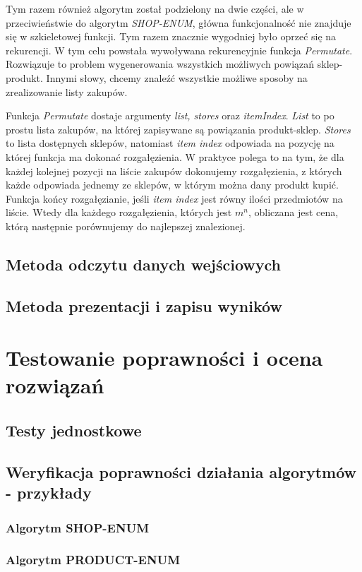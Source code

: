 \documentclass[a4paper]{article}
\let\oldsection\section
\renewcommand\section{\clearpage\oldsection}
\begin{document}
Tym razem również algorytm został podzielony na dwie części, ale w przeciwieństwie do algorytm \textit{SHOP-ENUM}, główna funkcjonalność nie znajduje się w szkieletowej funkcji. Tym razem znacznie wygodniej było oprzeć się na rekurencji. W tym celu powstała wywoływana rekurencyjnie funkcja \textit{Permutate}. Rozwiązuje to problem wygenerowania wszystkich możliwych powiązań sklep-produkt. Innymi słowy, chcemy znaleźć wszystkie możliwe sposoby na zrealizowanie listy zakupów.

Funkcja \textit{Permutate} dostaje argumenty \textit{list, stores} oraz \textit{itemIndex}. \textit{List} to po prostu lista zakupów, na której zapisywane są powiązania produkt-sklep. \textit{Stores} to lista dostępnych sklepów, natomiast \textit{item index} odpowiada na pozycję na której funkcja ma dokonać rozgałęzienia. W praktyce polega to na tym, że dla każdej kolejnej pozycji na liście zakupów dokonujemy rozgałęzienia, z których każde odpowiada jednemy ze sklepów, w którym można dany produkt kupić. Funkcja końcy rozgałęzianie, jeśli \textit{item index} jest równy ilości przedmiotów na liście. Wtedy dla każdego rozgałęzienia, których jest $m^n$, obliczana jest cena, którą następnie porównujemy do najlepszej znalezionej.
\subsection{Metoda odczytu danych wejściowych}
\subsection{Metoda prezentacji i zapisu wyników}

\section{Testowanie poprawności i ocena rozwiązań}
\subsection{Testy jednostkowe}
\subsection{Weryfikacja poprawności działania algorytmów - przykłady}
\subsubsection{Algorytm SHOP-ENUM}
\subsubsection{Algorytm PRODUCT-ENUM}
\end{document}
